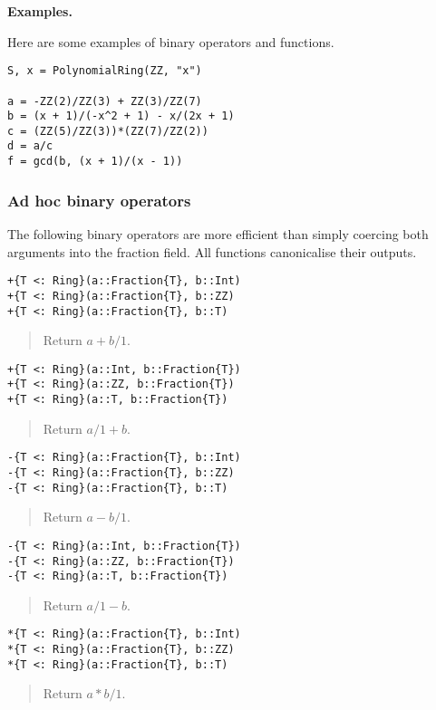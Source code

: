 \documentclass[a4paper,10pt]{article}
\newcommand{\desc}[1]{\vspace{-3mm}\begin{quote}#1\end{quote}}
\begin{document}
{{\textbf{Examples.}

Here are some examples of binary operators and functions.

\begin{lstlisting}
S, x = PolynomialRing(ZZ, "x")

a = -ZZ(2)/ZZ(3) + ZZ(3)/ZZ(7)
b = (x + 1)/(-x^2 + 1) - x/(2x + 1)
c = (ZZ(5)/ZZ(3))*(ZZ(7)/ZZ(2))
d = a/c
f = gcd(b, (x + 1)/(x - 1))
\end{lstlisting}

\subsubsection{Ad hoc binary operators}

The following binary operators are more efficient than simply coercing both
arguments into the fraction field. All functions canonicalise their outputs.

\begin{lstlisting}
+{T <: Ring}(a::Fraction{T}, b::Int)
+{T <: Ring}(a::Fraction{T}, b::ZZ)
+{T <: Ring}(a::Fraction{T}, b::T)
\end{lstlisting}

\desc{Return $a + b/1$.}

\begin{lstlisting}
+{T <: Ring}(a::Int, b::Fraction{T})
+{T <: Ring}(a::ZZ, b::Fraction{T})
+{T <: Ring}(a::T, b::Fraction{T})
\end{lstlisting}

\desc{Return $a/1 + b$.}

\begin{lstlisting}
-{T <: Ring}(a::Fraction{T}, b::Int)
-{T <: Ring}(a::Fraction{T}, b::ZZ)
-{T <: Ring}(a::Fraction{T}, b::T)
\end{lstlisting}

\desc{Return $a - b/1$.}

\begin{lstlisting}
-{T <: Ring}(a::Int, b::Fraction{T})
-{T <: Ring}(a::ZZ, b::Fraction{T})
-{T <: Ring}(a::T, b::Fraction{T})
\end{lstlisting}

\desc{Return $a/1 - b$.}

\begin{lstlisting}
*{T <: Ring}(a::Fraction{T}, b::Int)
*{T <: Ring}(a::Fraction{T}, b::ZZ)
*{T <: Ring}(a::Fraction{T}, b::T)
\end{lstlisting}

\desc{Return $a * b/1$.}

}}
\end{document}
